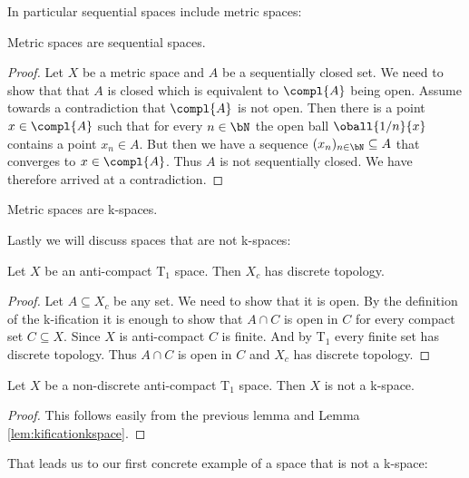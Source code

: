 In particular sequential spaces include metric spaces: 

\begin{lem}\label{lem:metricissequential}
    Metric spaces are sequential spaces.
\end{lem}
\begin{proof}
    Let $X$ be a metric space and $A$ be a sequentially closed set. 
    We need to show that that $A$ is closed which is equivalent to $\compl{A}$ being open.
    Assume towards a contradiction that $\compl{A}$ is not open. 
    Then there is a point $x \in \compl{A}$ such that for every $n \in \bN$ the open ball $\oball{1/n}{x}$ contains a point $x_n \in A$. 
    But then we have a sequence $(x_n)_{n \in \bN} \subseteq A$ that converges to $x \in \compl{A}$. Thus $A$ is not sequentially closed. 
    We have therefore arrived at a contradiction. 
\end{proof}

\begin{cor}
    Metric spaces are k-spaces.
\end{cor}

Lastly we will discuss spaces that are not k-spaces:

\begin{lem}
    Let $X$ be an anti-compact T$_1$ space.
    Then $X_c$ has discrete topology.
\end{lem}
\begin{proof}
    Let $A \subseteq X_c$ be any set. We need to show that it is open. 
    By the definition of the k-ification it is enough to show that $A \cap C$
    is open in $C$ for every compact set $C \subseteq X$. 
    Since $X$ is anti-compact $C$ is finite.
    And by T$_1$ every finite set has discrete topology. 
    Thus $A \cap C$ is open in $C$ and $X_c$ has discrete topology.
\end{proof}

\begin{cor}
    Let $X$ be a non-discrete anti-compact T$_1$ space.
    Then $X$ is not a k-space.
\end{cor}
\begin{proof}
    This follows easily from the previous lemma and Lemma \ref{lem:kificationkspace}.
\end{proof}

That leads us to our first concrete example of a space that is not a k-space: 

